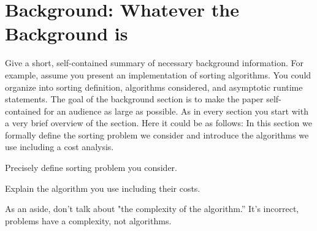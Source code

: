 \section{Background: Whatever the Background is}
  \label{sec:background}

  Give a short, self-contained summary of necessary
  background information. For example, assume you present an
  implementation of sorting algorithms. You could organize into sorting
  definition, algorithms considered, and asymptotic runtime statements. The goal of the
  background section is to make the paper self-contained for an audience
  as large as possible. As in every section
  you start with a very brief overview of the section. Here it could be as follows: In this section 
  we formally define the sorting problem we consider and introduce the algorithms we use
  including a cost analysis.

  Precisely define sorting problem you consider.

  Explain the algorithm you use including their costs.

  As an aside, don't talk about "the complexity of the algorithm.'' It's incorrect,
  problems have a complexity, not algorithms.


